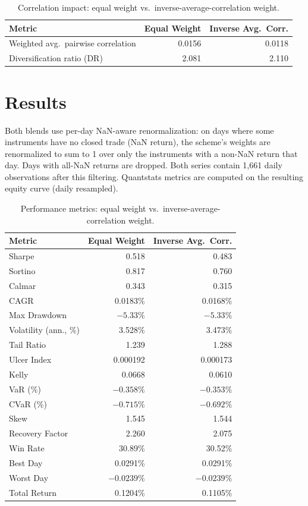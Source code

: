 \documentclass[11pt]{article}
\begin{document}
\begin{table}[h]
\centering
\caption{Correlation impact: equal weight vs.\ inverse-average-correlation weight.}
\begin{tabular}{lrr}
\toprule
Metric & Equal Weight & Inverse Avg.\ Corr. \\
\midrule
Weighted avg.\ pairwise correlation & 0.0156 & 0.0118 \\
Diversification ratio (DR) & 2.081 & 2.110 \\
\bottomrule
\end{tabular}
\end{table}

\section{Results}

Both blends use per-day NaN-aware renormalization: on days where some instruments
have no closed trade (NaN return), the scheme's weights are renormalized to sum to
1 over only the instruments with a non-NaN return that day. Days with all-NaN
returns are dropped. Both series contain 1{,}661 daily observations after this
filtering. Quantstats metrics are computed on the resulting equity curve (daily
resampled).

\begin{table}[h]
\centering
\caption{Performance metrics: equal weight vs.\ inverse-average-correlation weight.}
\begin{tabular}{lrr}
\toprule
Metric & Equal Weight & Inverse Avg.\ Corr. \\
\midrule
Sharpe & 0.518 & 0.483 \\
Sortino & 0.817 & 0.760 \\
Calmar & 0.343 & 0.315 \\
CAGR & 0.0183\% & 0.0168\% \\
Max Drawdown & $-5.33\%$ & $-5.33\%$ \\
Volatility (ann., \%) & 3.528\% & 3.473\% \\
Tail Ratio & 1.239 & 1.288 \\
Ulcer Index & 0.000192 & 0.000173 \\
Kelly & 0.0668 & 0.0610 \\
VaR (\%) & $-0.358\%$ & $-0.353\%$ \\
CVaR (\%) & $-0.715\%$ & $-0.692\%$ \\
Skew & 1.545 & 1.544 \\
Recovery Factor & 2.260 & 2.075 \\
\midrule
Win Rate & 30.89\% & 30.52\% \\
Best Day & 0.0291\% & 0.0291\% \\
Worst Day & $-0.0239\%$ & $-0.0239\%$ \\
Total Return & 0.1204\% & 0.1105\% \\
\bottomrule
\end{tabular}
\end{table}
\end{document}
